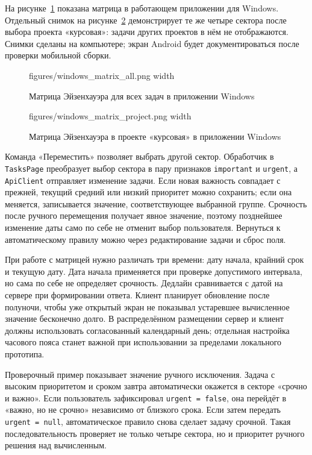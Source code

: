 \documentclass[14pt,a4paper]{extarticle}
\begin{document}
На рисунке~\ref{fig:matrix-all} показана матрица в работающем приложении для Windows. Отдельный снимок на рисунке~\ref{fig:matrix-project} демонстрирует те же четыре сектора после выбора проекта «курсовая»: задачи других проектов в нём не отображаются. Снимки сделаны на компьютере; экран Android будет документироваться после проверки мобильной сборки.

\begin{figure}[!htbp]
\centering
\XeTeXpicfile figures/windows_matrix_all.png width \linewidth
\caption{Матрица Эйзенхауэра для всех задач в приложении Windows}
\label{fig:matrix-all}
\end{figure}

\begin{figure}[!htbp]
\centering
\XeTeXpicfile figures/windows_matrix_project.png width \linewidth
\caption{Матрица Эйзенхауэра в проекте «курсовая» в приложении Windows}
\label{fig:matrix-project}
\end{figure}

Команда «Переместить» позволяет выбрать другой сектор. Обработчик в \texttt{TasksPage} преобразует выбор сектора в пару признаков \texttt{important} и \texttt{urgent}, а \texttt{ApiClient} отправляет изменение задачи. Если новая важность совпадает с прежней, текущий средний или низкий приоритет можно сохранить; если она меняется, записывается значение, соответствующее выбранной группе. Срочность после ручного перемещения получает явное значение, поэтому позднейшее изменение даты само по себе не отменит выбор пользователя. Вернуться к автоматическому правилу можно через редактирование задачи и сброс поля.

При работе с матрицей нужно различать три времени: дату начала, крайний срок и текущую дату. Дата начала применяется при проверке допустимого интервала, но сама по себе не определяет срочность. Дедлайн сравнивается с датой на сервере при формировании ответа. Клиент планирует обновление после полуночи, чтобы уже открытый экран не показывал устаревшее вычисленное значение бесконечно долго. В распределённом размещении сервер и клиент должны использовать согласованный календарный день; отдельная настройка часового пояса станет важной при использовании за пределами локального прототипа.

Проверочный пример показывает значение ручного исключения. Задача с высоким приоритетом и сроком завтра автоматически окажется в секторе «срочно и важно». Если пользователь зафиксировал \texttt{urgent\ =\ false}, она перейдёт в «важно, но не срочно» независимо от близкого срока. Если затем передать \texttt{urgent\ =\ null}, автоматическое правило снова сделает задачу срочной. Такая последовательность проверяет не только четыре сектора, но и приоритет ручного решения над вычисленным.
\end{document}

